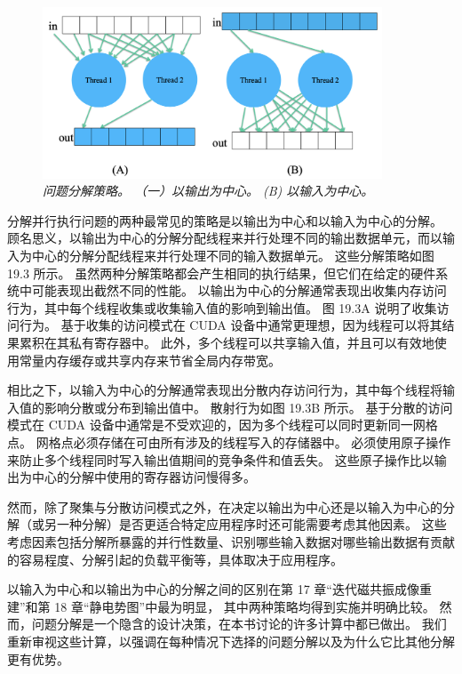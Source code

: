 \begin{figure}[H]
	\centering
	\includegraphics[width=0.9\textwidth]{figs/F19.3.png}
	\caption{\textit{问题分解策略。 （一）以输出为中心。 (B) 以输入为中心。}}
\end{figure}

分解并行执行问题的两种最常见的策略是以输出为中心和以输入为中心的分解。 
顾名思义，以输出为中心的分解分配线程来并行处理不同的输出数据单元，而以输入为中心的分解分配线程来并行处理不同的输入数据单元。 
这些分解策略如图 19.3 所示。 虽然两种分解策略都会产生相同的执行结果，但它们在给定的硬件系统中可能表现出截然不同的性能。 
以输出为中心的分解通常表现出收集内存访问行为，其中每个线程收集或收集输入值的影响到输出值。 
图 19.3A 说明了收集访问行为。 基于收集的访问模式在 CUDA 设备中通常更理想，因为线程可以将其结果累积在其私有寄存器中。 
此外，多个线程可以共享输入值，并且可以有效地使用常量内存缓存或共享内存来节省全局内存带宽。

相比之下，以输入为中心的分解通常表现出分散内存访问行为，其中每个线程将输入值的影响分散或分布到输出值中。 
散射行为如图 19.3B 所示。 基于分散的访问模式在 CUDA 设备中通常是不受欢迎的，因为多个线程可以同时更新同一网格点。 
网格点必须存储在可由所有涉及的线程写入的存储器中。 必须使用原子操作来防止多个线程同时写入输出值期间的竞争条件和值丢失。 
这些原子操作比以输出为中心的分解中使用的寄存器访问慢得多。

然而，除了聚集与分散访问模式之外，在决定以输出为中心还是以输入为中心的分解（或另一种分解）是否更适合特定应用程序时还可能需要考虑其他因素。 
这些考虑因素包括分解所暴露的并行性数量、识别哪些输入数据对哪些输出数据有贡献的容易程度、分解引起的负载平衡等，具体取决于应用程序。

以输入为中心和以输出为中心的分解之间的区别在第 17 章“迭代磁共振成像重建”和第 18 章“静电势图”中最为明显，
其中两种策略均得到实施并明确比较。 然而，问题分解是一个隐含的设计决策，在本书讨论的许多计算中都已做出。 
我们重新审视这些计算，以强调在每种情况下选择的问题分解以及为什么它比其他分解更有优势。

